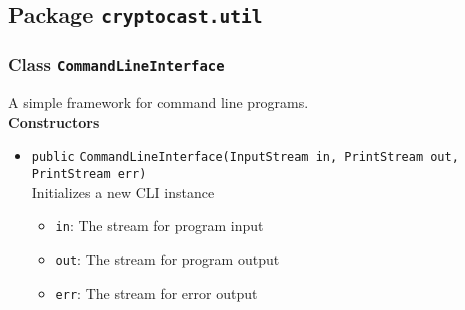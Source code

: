 \subsection{Package \lstinline!cryptocast.util!}
\subsubsection{Class \lstinline|CommandLineInterface|}
A simple framework for command line programs. \\




\textbf{Constructors}
\begin{itemize}
\item \lstinline|public| \lstinline|CommandLineInterface|\lstinline|(InputStream in, PrintStream out, PrintStream err)|\\
Initializes a new CLI instance
\begin{itemize}
\item \lstinline|in|: The stream for program input
\item \lstinline|out|: The stream for program output
\item \lstinline|err|: The stream for error output
\end{itemize}



\end{itemize}


